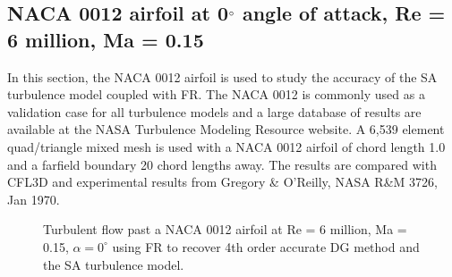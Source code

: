 \graphicspath{{figures_RANS_naca0012/}}%

\subsection{NACA 0012 airfoil at 0$^{\circ}$ angle of attack, Re = 6 million, Ma = 0.15}
In this section, the NACA 0012 airfoil is used to study the accuracy of the SA turbulence model coupled with FR. The NACA 0012 is commonly used as a validation case for all turbulence models and a large database of results are available at the NASA Turbulence Modeling Resource website. A 6,539 element quad/triangle mixed mesh is used with a NACA 0012 airfoil of chord length 1.0 and a farfield boundary 20 chord lengths away. The results are compared with CFL3D and experimental results from Gregory \& O'Reilly, NASA R\&M 3726, Jan 1970.

\begin{figure}
  \begin{subfigmatrix}{2}
  \end{subfigmatrix}
  \caption{Turbulent flow past a NACA 0012 airfoil at Re = 6 million, Ma = 0.15, $\alpha = 0^{\circ}$ using FR to recover 4th order accurate DG method and the SA turbulence model.}
  \label{RANS_naca0012}
\end{figure}


